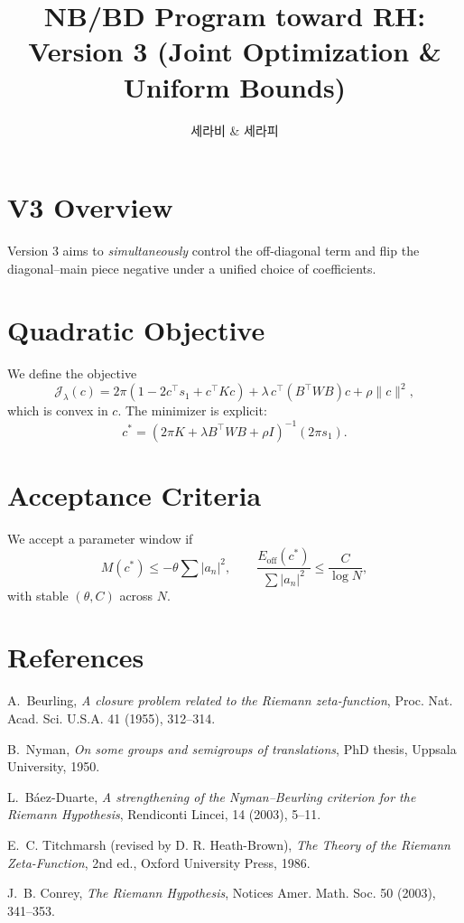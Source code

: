 \documentclass[12pt]{article}
\title{NB/BD Program toward RH: Version 3 (Joint Optimization \& Uniform Bounds)}
\author{세라비 \& 세라피}
\date{}
\begin{document}
\maketitle

\section{V3 Overview}
Version 3 aims to \emph{simultaneously} control the off-diagonal term and flip the diagonal--main piece negative under a unified choice of coefficients.

\section{Quadratic Objective}
We define the objective
\begin{equation}
\mathcal{J}_\lambda(c)=2\pi(1-2c^\top s_1+c^\top Kc)+\lambda\,c^\top(B^\top W B)c+\rho\|c\|^2,
\end{equation}
which is convex in $c$. The minimizer is explicit:
\begin{equation}
c^\ast=(2\pi K+\lambda B^\top W B+\rho I)^{-1}(2\pi s_1).
\end{equation}

\section{Acceptance Criteria}
We accept a parameter window if
\begin{equation}
M(c^\ast)\le -\theta\sum|a_n|^2,\qquad
\frac{E_{\mathrm{off}}(c^\ast)}{\sum|a_n|^2}\le \frac{C}{\log N},
\end{equation}
with stable $(\theta,C)$ across $N$.

\section{References}
\begin{thebibliography}{9}

A.~Beurling,
\textit{A closure problem related to the Riemann zeta-function},
Proc. Nat. Acad. Sci. U.S.A. 41 (1955), 312--314.

B.~Nyman,
\textit{On some groups and semigroups of translations},
PhD thesis, Uppsala University, 1950.

L.~Báez-Duarte,
\textit{A strengthening of the Nyman--Beurling criterion for the Riemann Hypothesis},
Rendiconti Lincei, 14 (2003), 5--11.

E.~C. Titchmarsh (revised by D. R. Heath-Brown),
\textit{The Theory of the Riemann Zeta-Function},
2nd ed., Oxford University Press, 1986.

J.~B. Conrey,
\textit{The Riemann Hypothesis},
Notices Amer. Math. Soc. 50 (2003), 341--353.

\end{thebibliography}
\end{document}
